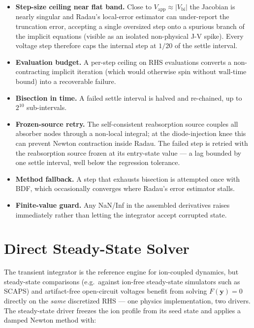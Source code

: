 \documentclass[
  11pt,
  american,
]{report}
\providecommand{\tightlist}{%
  \setlength{\itemsep}{0pt}\setlength{\parskip}{0pt}}
\begin{document}
\begin{itemize}
\tightlist
\item
  \textbf{Step-size ceiling near flat band.} Close to
  \(V_\mathrm{app} \approx |V_\mathrm{bi}|\) the Jacobian is nearly
  singular and Radau's local-error estimator can under-report the
  truncation error, accepting a single oversized step onto a spurious
  branch of the implicit equations (visible as an isolated non-physical
  J-V spike). Every voltage step therefore caps the internal step at
  \(1/20\) of the settle interval.
\item
  \textbf{Evaluation budget.} A per-step ceiling on RHS evaluations
  converts a non-contracting implicit iteration (which would otherwise
  spin without wall-time bound) into a recoverable failure.
\item
  \textbf{Bisection in time.} A failed settle interval is halved and
  re-chained, up to \(2^{10}\) sub-intervals.
\item
  \textbf{Frozen-source retry.} The self-consistent reabsorption source
  couples all absorber nodes through a non-local integral; at the
  diode-injection knee this can prevent Newton contraction inside Radau.
  The failed step is retried with the reabsorption source frozen at its
  entry-state value --- a lag bounded by one settle interval, well below
  the regression tolerance.
\item
  \textbf{Method fallback.} A step that exhausts bisection is attempted
  once with BDF, which occasionally converges where Radau's error
  estimator stalls.
\item
  \textbf{Finite-value guard.} Any NaN/Inf in the assembled derivatives
  raises immediately rather than letting the integrator accept corrupted
  state.
\end{itemize}

\hypertarget{direct-steady-state-solver}{%
\section{Direct Steady-State Solver}\label{direct-steady-state-solver}}

The transient integrator is the reference engine for ion-coupled
dynamics, but steady-state comparisons (e.g.~against ion-free
steady-state simulators such as SCAPS) and artifact-free open-circuit
voltages benefit from solving \(F(\mathbf{y}) = 0\) directly on the
\emph{same} discretized RHS --- one physics implementation, two drivers.
The steady-state driver freezes the ion profile from its seed state and
applies a damped Newton method with:
\end{document}
